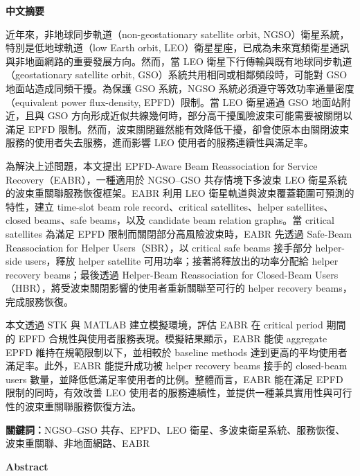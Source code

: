 \documentclass[10pt,a4paper,fontset=none]{ctexart}
\begin{document}
\begin{center}
  {\Large\bfseries 中文摘要}
\end{center}
\vspace{0.5em}

近年來，非地球同步軌道（non-geostationary satellite orbit, NGSO）衛星系統，特別是低地球軌道（low Earth orbit, LEO）衛星星座，已成為未來寬頻衛星通訊與非地面網路的重要發展方向。然而，當 LEO 衛星下行傳輸與既有地球同步軌道（geostationary satellite orbit, GSO）系統共用相同或相鄰頻段時，可能對 GSO 地面站造成同頻干擾。為保護 GSO 系統，NGSO 系統必須遵守等效功率通量密度（equivalent power flux-density, EPFD）限制。當 LEO 衛星通過 GSO 地面站附近，且與 GSO 方向形成近似共線幾何時，部分高干擾風險波束可能需要被關閉以滿足 EPFD 限制。然而，波束關閉雖然能有效降低干擾，卻會使原本由關閉波束服務的使用者失去服務，進而影響 LEO 使用者的服務連續性與滿足率。

為解決上述問題，本文提出 EPFD-Aware Beam Reassociation for Service Recovery（EABR），一種適用於 NGSO--GSO 共存情境下多波束 LEO 衛星系統的波束重關聯服務恢復框架。EABR 利用 LEO 衛星軌道與波束覆蓋範圍可預測的特性，建立 time-slot beam role record、critical satellites、helper satellites、closed beams、safe beams，以及 candidate beam relation graphs。當 critical satellites 為滿足 EPFD 限制而關閉部分高風險波束時，EABR 先透過 Safe-Beam Reassociation for Helper Users（SBR），以 critical safe beams 接手部分 helper-side users，釋放 helper satellite 可用功率；接著將釋放出的功率分配給 helper recovery beams；最後透過 Helper-Beam Reassociation for Closed-Beam Users（HBR），將受波束關閉影響的使用者重新關聯至可行的 helper recovery beams，完成服務恢復。

本文透過 STK 與 MATLAB 建立模擬環境，評估 EABR 在 critical period 期間的 EPFD 合規性與使用者服務表現。模擬結果顯示，EABR 能使 aggregate EPFD 維持在規範限制以下，並相較於 baseline methods 達到更高的平均使用者滿足率。此外，EABR 能提升成功被 helper recovery beams 接手的 closed-beam users 數量，並降低低滿足率使用者的比例。整體而言，EABR 能在滿足 EPFD 限制的同時，有效改善 LEO 使用者的服務連續性，並提供一種兼具實用性與可行性的波束重關聯服務恢復方法。

\vspace{0.8em}
\noindent\textbf{關鍵詞：}NGSO--GSO 共存、EPFD、LEO 衛星、多波束衛星系統、服務恢復、波束重關聯、非地面網路、EABR

\vspace{2em}

\begin{center}
  {\Large\bfseries Abstract}
\end{center}
\vspace{0.5em}
\end{document}
